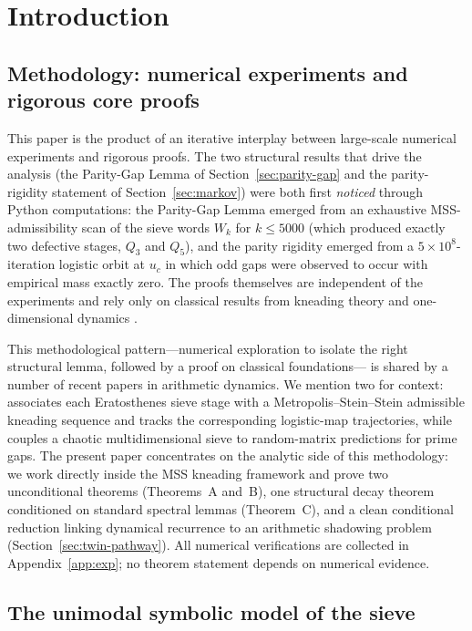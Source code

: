 \documentclass{iopjournal}
\theoremstyle{definition}
\begin{document}
\section{Introduction}

\subsection{Methodology: numerical experiments and rigorous core proofs}
\label{ssec:methodology}

This paper is the product of an iterative interplay between large-scale
numerical experiments and rigorous proofs. The two structural results
that drive the analysis (the Parity-Gap Lemma of
Section~\ref{sec:parity-gap} and the parity-rigidity statement of
Section~\ref{sec:markov}) were both first \emph{noticed} through Python
computations: the Parity-Gap Lemma emerged from an exhaustive
MSS-admissibility scan of the sieve words $W_k$ for $k \leq 5000$
(which produced exactly two defective stages, $Q_3$ and $Q_5$), and the
parity rigidity emerged from a $5 \times 10^8$-iteration logistic orbit
at $u_c$ in which odd gaps were observed to occur with empirical mass
exactly zero. The proofs themselves are independent of the experiments
and rely only on classical results from kneading theory and
one-dimensional dynamics
\cite{milnor1988iterated,misiurewicz1981absolutely,baladi2000positive}.

This methodological pattern---numerical exploration to isolate the
right structural lemma, followed by a proof on classical foundations---
is shared by a number of recent papers in arithmetic dynamics. We
mention two for context: \cite{wang2026emergence} associates each
Eratosthenes sieve stage with a Metropolis--Stein--Stein admissible
kneading sequence and tracks the corresponding logistic-map
trajectories, while \cite{chaoticsieve2025} couples a chaotic
multidimensional sieve to random-matrix predictions for prime gaps.
The present paper concentrates on the analytic side of this
methodology: we work directly inside the MSS kneading framework and
prove two unconditional theorems (Theorems~A and~B), one structural
decay theorem conditioned on standard spectral lemmas (Theorem~C),
and a clean conditional reduction linking dynamical recurrence to an
arithmetic shadowing problem (Section~\ref{sec:twin-pathway}). All
numerical verifications are collected in Appendix~\ref{app:exp}; no
theorem statement depends on numerical evidence.

\subsection{The unimodal symbolic model of the sieve}
\end{document}
